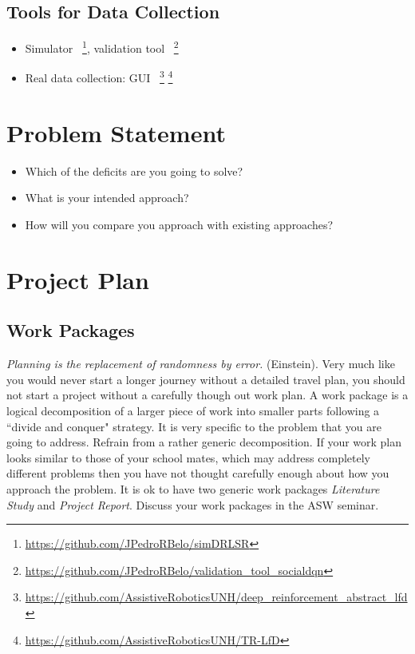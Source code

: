 \documentclass[thesis]{mas_proposal}
\begin{document}
\subsection{Tools for Data Collection}
\begin{itemize}
\item Simulator~\cite{Belo2021} \footnote{\url{https://github.com/JPedroRBelo/simDRLSR}}, validation tool~\cite{Belo2022} \footnote{\url{https://github.com/JPedroRBelo/validation_tool_socialdqn}}

\item Real data collection:  GUI~\cite{Turner2018} \footnote{\url{https://github.com/AssistiveRoboticsUNH/deep_reinforcement_abstract_lfd}} \cite{carpio2018learning,carpio2019learning} \footnote{\url{https://github.com/AssistiveRoboticsUNH/TR-LfD}}
\end{itemize}

\section{Problem Statement}
\begin{itemize}
    \item Which of the deficits are you going to solve?
    \item What is your intended approach?
    \item How will you compare you approach with existing approaches?
\end{itemize}

\section{Project Plan}

\subsection{Work Packages}
\emph{Planning is the replacement of randomness by error.} (Einstein). Very much like you would never start a longer journey without a detailed travel plan, you should not start a project without a carefully though out work plan. A work package is a logical decomposition of a larger piece of work into smaller parts following a ``divide and conquer" strategy. It is very specific to the problem that you are going to address. Refrain from a rather generic decomposition. If your work plan looks similar to those of your school mates, which may address completely different problems then you have not thought carefully enough about how you approach the problem. It is ok to have two generic work packages \emph{Literature Study} and \emph{Project Report}. Discuss your work packages in the ASW seminar.
\end{document}
